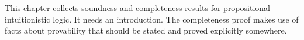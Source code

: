 \documentclass[../../../include/open-logic-chapter]{subfiles}
\begin{document}

\begin{editorial}
  This chapter collects soundness and completeness results for
  propositional intuitionistic logic. It needs an introduction. The
  completeness proof makes use of facts about provability that should
  be stated and proved explicitly somewhere.
\end{editorial}


\OLEndChapterHook
\end{document}
